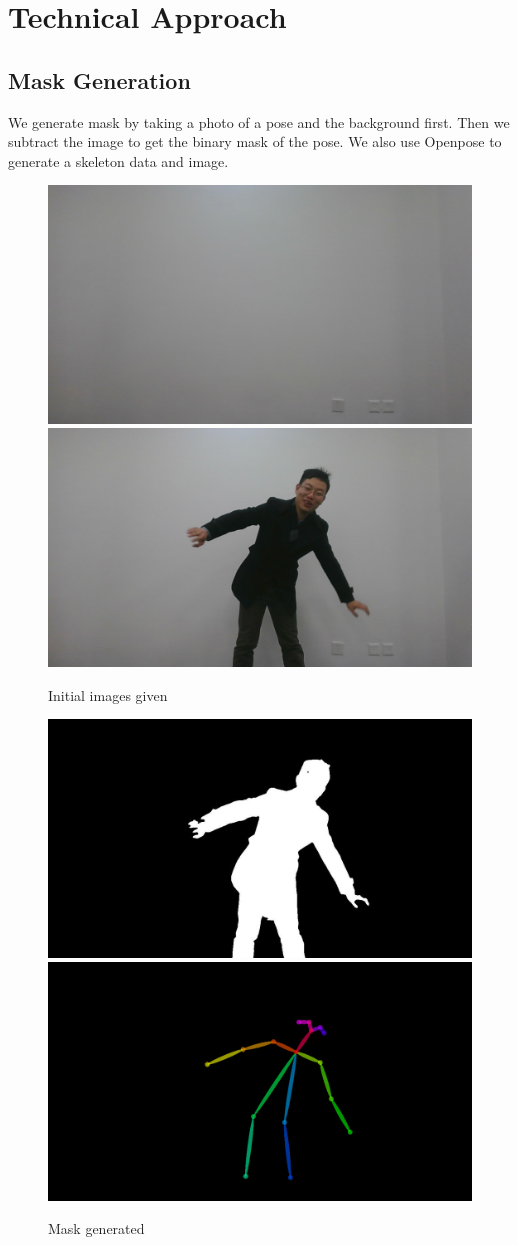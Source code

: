 \documentclass[11pt,twocolumn,letterpaper]{article}
\begin{document}
\section{Technical Approach}
	\subsection{Mask Generation}
		\par We generate mask by taking a photo of a pose and the background first.
		Then we subtract the image to get the binary mask of the pose.
		We also use Openpose to generate a skeleton data and image.
		\begin{figure}[h]
			\centering
			\includegraphics[width=0.45\linewidth]{./Pic/Approach_Mask_back}
			\includegraphics[width=0.45\linewidth]{./Pic/Approach_Mask_pose}
			\caption{Initial images given}
		\end{figure}
		\begin{figure}[h]
			\centering
			\includegraphics[width=0.9\linewidth]{./Pic/Approach_Mask_binary_mask}
			\includegraphics[width=0.9\linewidth]{./Pic/Approach_Mask_skeleton}
			\caption{Mask generated}
		\end{figure}
\end{document}
